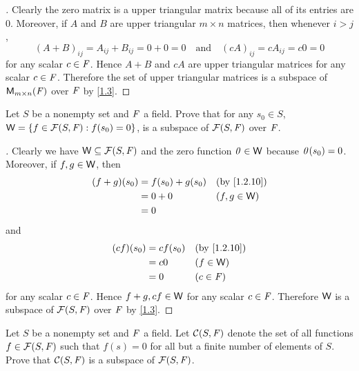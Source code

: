\begin{proof}[]
	Clearly the zero matrix is a upper triangular matrix because all of its entries are \(0\).
	Moreover, if \(A\) and \(B\) are upper triangular \(m \times n\) matrices, then whenever \(i > j\),
	\[
		(A + B)_{i j} = A_{i j} + B_{i j} = 0 + 0 = 0 \quad \text{and} \quad (cA)_{i j} = cA_{i j} = c0 = 0
	\]
	for any scalar \(c \in \mathit{F}\).
	Hence \(A + B\) and \(cA\) are upper triangular matrices for any scalar \(c \in \mathit{F}\).
	Therefore the set of upper triangular matrices is a subspace of \(\ms\) over \(\mathit{F}\) by \cref{1.3}.
\end{proof}

\begin{ex}\label{ex:1.3.13}
	Let \(S\) be a nonempty set and \(\mathit{F}\) a field.
	Prove that for any \(s_0 \in S\), \(\mathsf{W} = \left\lbrace f \in \mathcal{F}(S, \mathit{F}) : f(s_0) = 0\right\rbrace\), is a subspace of \(\mathcal{F}(S, \mathit{F})\) over \(\mathit{F}\).
\end{ex}

\begin{proof}[]
	Clearly we have \(\mathsf{W} \subseteq \mathcal{F}(S, \mathit{F})\) and the zero function \(\mathit{0} \in \mathsf{W}\) because \(\mathit{0}(s_0) = 0\).
	Moreover, if \(f, g \in \mathsf{W}\), then
	\begin{align*}
		(f + g)(s_0) & = f(s_0) + g(s_0) &  & \by{1.2.10}   \\
		             & = 0 + 0           &  & (f, g \in \W) \\
		             & = 0
	\end{align*}
	and
	\begin{align*}
		(cf)(s_0) & = cf(s_0) &  & \by{1.2.10} \\
		          & = c0      &  & (f \in \W)  \\
		          & = 0       &  & (c \in \F)
	\end{align*}
	for any scalar \(c \in \mathit{F}\).
	Hence \(f + g, cf \in \mathsf{W}\) for any scalar \(c \in \mathit{F}\).
	Therefore \(\mathsf{W}\) is a subspace of \(\mathcal{F}(S, \mathit{F})\) over \(\mathit{F}\) by \cref{1.3}.
\end{proof}

\begin{ex}\label{ex:1.3.14}
	Let \(S\) be a nonempty set and \(\mathit{F}\) a field.
	Let \(\mathcal{C}(S, \mathit{F})\) denote the set of all functions \(f \in \mathcal{F}(S, \mathit{F})\) such that \(f(s) = 0\) for all but a finite number of elements of \(S\).
	Prove that \(\mathcal{C}(S, \mathit{F})\) is a subspace of \(\mathcal{F}(S, \mathit{F})\).
\end{ex}

